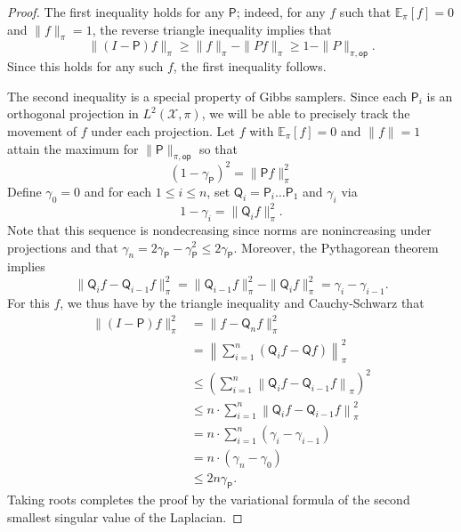 \documentclass[11pt]{article}
\begin{document}
\begin{proof}
    The first inequality holds for any $\mathsf{P}$; indeed, for any $f$ such that $\mathbb{E}_{\pi}[f]=0$ and $\|f\|_{\pi}=1$, the reverse triangle inequality implies that
    \begin{equation*}
\|(I-\mathsf{P})f\|_{\pi}\geq \|f\|_{\pi}-\|Pf\|_{\pi}\geq 1-\|P\|_{\pi,\mathsf{op}}.
    \end{equation*}
    Since this holds for any such $f$, the first inequality follows.

    The second inequality is a special property of Gibbs samplers. Since each $\mathsf{P}_i$ is an orthogonal projection in $L^2(\mathcal{X},\pi)$, we will be able to precisely track the movement of $f$ under each projection. Let $f$ with $\mathbb{E}_{\pi}[f]=0$ and $\|f\|=1$ attain the maximum for $\|\mathsf{P}\|_{\pi,\mathsf{op}}$ so that
    \begin{equation*}
        (1-\gamma_{\mathsf{P}})^2=\|\mathsf{P}f\|_{\pi}^2
    \end{equation*} 
    Define $\gamma_0 = 0$ and for each $1\leq i\leq n$, set $\mathsf{Q}_i=\mathsf{P}_i\ldots \mathsf{P}_1$ and $\gamma_i$ via
    \begin{equation*}
        1-\gamma_i = \|\mathsf{Q}_if\|_{\pi}^2.
    \end{equation*}
    Note that this sequence is nondecreasing since norms are nonincreasing under projections and that $\gamma_n=2\gamma_{\mathsf{P}}-\gamma_{\mathsf{P}}^2\leq 2\gamma_{\mathsf{P}}$. Moreover, the Pythagorean theorem implies
    \begin{equation*}
        \|\mathsf{Q}_if-\mathsf{Q}_{i-1}f\|_{\pi}^2 = \|\mathsf{Q}_{i-1}f\|_{\pi}^2-\|\mathsf{Q}_if\|_{\pi}^2=\gamma_i-\gamma_{i-1}.
    \end{equation*}
    For this $f$, we thus have by the triangle inequality and Cauchy-Schwarz that
    \begin{align*}
        \|(I-\mathsf{P})f\|_{\pi}^2 &= \|f-\mathsf{Q}_nf\|_{\pi}^2\\
        &=\left\|\sum_{i=1}^n (\mathsf{Q}_if - \mathsf{Q}f)\right\|_{\pi}^2\\
        &\leq \left(\sum_{i=1}^n\left\|\mathsf{Q}_if - \mathsf{Q}_{i-1}f\right\|_{\pi}\right)^2\\
        &\leq n\cdot \sum_{i=1}^n\left\|\mathsf{Q}_if - \mathsf{Q}_{i-1}f\right\|_{\pi}^2\\
        &=n\cdot \sum_{i=1}^n(\gamma_i-\gamma_{i-1})\\
        &= n\cdot (\gamma_n-\gamma_0)\\
        &\leq 2n\gamma_{\mathsf{P}}.
    \end{align*}
Taking roots completes the proof by the variational formula of the second smallest singular value of the Laplacian.
\end{proof}
\end{document}
